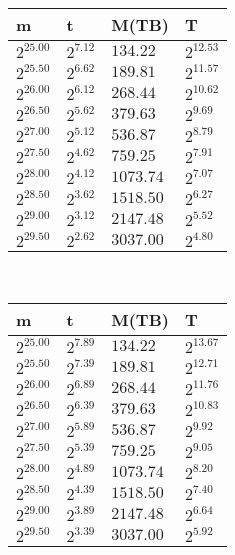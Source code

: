  \ 
\begin{tabular}{llll}
m & t & M(TB) & T \\ \hline
$2^{25.00}$ & $2^{7.12}$ & $134.22$ & $2^{12.53}$ \\
$2^{25.50}$ & $2^{6.62}$ & $189.81$ & $2^{11.57}$ \\
$2^{26.00}$ & $2^{6.12}$ & $268.44$ & $2^{10.62}$ \\
$2^{26.50}$ & $2^{5.62}$ & $379.63$ & $2^{9.69}$ \\
$2^{27.00}$ & $2^{5.12}$ & $536.87$ & $2^{8.79}$ \\
$2^{27.50}$ & $2^{4.62}$ & $759.25$ & $2^{7.91}$ \\
$2^{28.00}$ & $2^{4.12}$ & $1073.74$ & $2^{7.07}$ \\
$2^{28.50}$ & $2^{3.62}$ & $1518.50$ & $2^{6.27}$ \\
$2^{29.00}$ & $2^{3.12}$ & $2147.48$ & $2^{5.52}$ \\
$2^{29.50}$ & $2^{2.62}$ & $3037.00$ & $2^{4.80}$ \\
\end{tabular}
 \ 
\begin{tabular}{llll}
m & t & M(TB) & T \\ \hline
$2^{25.00}$ & $2^{7.89}$ & $134.22$ & $2^{13.67}$ \\
$2^{25.50}$ & $2^{7.39}$ & $189.81$ & $2^{12.71}$ \\
$2^{26.00}$ & $2^{6.89}$ & $268.44$ & $2^{11.76}$ \\
$2^{26.50}$ & $2^{6.39}$ & $379.63$ & $2^{10.83}$ \\
$2^{27.00}$ & $2^{5.89}$ & $536.87$ & $2^{9.92}$ \\
$2^{27.50}$ & $2^{5.39}$ & $759.25$ & $2^{9.05}$ \\
$2^{28.00}$ & $2^{4.89}$ & $1073.74$ & $2^{8.20}$ \\
$2^{28.50}$ & $2^{4.39}$ & $1518.50$ & $2^{7.40}$ \\
$2^{29.00}$ & $2^{3.89}$ & $2147.48$ & $2^{6.64}$ \\
$2^{29.50}$ & $2^{3.39}$ & $3037.00$ & $2^{5.92}$ \\
\end{tabular}
 \ 
